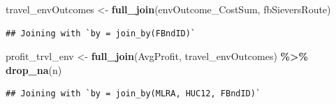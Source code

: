 \documentclass[
]{article}
\newenvironment{Shaded}{\begin{snugshade}}{\end{snugshade}}
\newcommand{\FunctionTok}[1]{\textcolor[rgb]{0.13,0.29,0.53}{\textbf{#1}}}
\newcommand{\NormalTok}[1]{#1}
\newcommand{\OtherTok}[1]{\textcolor[rgb]{0.56,0.35,0.01}{#1}}
\newcommand{\SpecialCharTok}[1]{\textcolor[rgb]{0.81,0.36,0.00}{\textbf{#1}}}
\begin{document}
\begin{Shaded}
\begin{Highlighting}[]
\NormalTok{travel\_envOutcomes }\OtherTok{\textless{}{-}} \FunctionTok{full\_join}\NormalTok{(envOutcome\_CostSum, fbSieversRoute)}
\end{Highlighting}
\end{Shaded}

\begin{verbatim}
## Joining with `by = join_by(FBndID)`
\end{verbatim}

\begin{Shaded}
\begin{Highlighting}[]
\NormalTok{profit\_trvl\_env }\OtherTok{\textless{}{-}} \FunctionTok{full\_join}\NormalTok{(AvgProfit, travel\_envOutcomes) }\SpecialCharTok{\%\textgreater{}\%}
  \FunctionTok{drop\_na}\NormalTok{(n)}
\end{Highlighting}
\end{Shaded}

\begin{verbatim}
## Joining with `by = join_by(MLRA, HUC12, FBndID)`
\end{verbatim}
\end{document}
